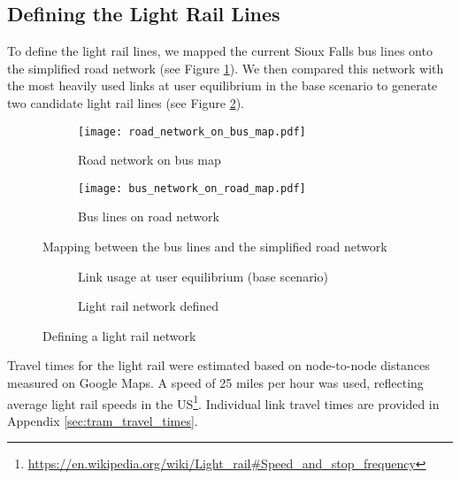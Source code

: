 \subsection{Defining the Light Rail Lines}

To define the light rail lines, we mapped the current Sioux Falls bus lines onto the simplified road network (see Figure \ref{fig:mapping_bus}). We then compared this network with the most heavily used links at user equilibrium in the base scenario to generate two candidate light rail lines (see Figure \ref{fig:light_rail_network}).

\begin{figure}
    \centering
    \begin{subfigure}{.45\textwidth}
        \centering
        \texttt{[image: road\_network\_on\_bus\_map.pdf]}
        \caption{Road network on bus map}
    \end{subfigure}%
    \begin{subfigure}{.45\textwidth}
        \centering
        \texttt{[image: bus\_network\_on\_road\_map.pdf]}
        \caption{Bus lines on road network}
    \end{subfigure}%
    \caption{Mapping between the bus lines and the simplified road network}
    \label{fig:mapping_bus}
\end{figure}

\begin{figure}
    \centering
    \begin{subfigure}{.45\textwidth}
        \centering
        \resizebox{.7\textwidth}{!}{}
        \caption{Link usage at user equilibrium (base scenario)}
    \end{subfigure}%
    \begin{subfigure}{.45\textwidth}
        \centering
        \resizebox{.7\textwidth}{!}{}
        \caption{Light rail network defined}
    \end{subfigure}%
    \caption{Defining a light rail network}
    \label{fig:light_rail_network}
\end{figure}

Travel times for the light rail were estimated based on node-to-node distances measured on Google Maps. A speed of 25 miles per hour was used, reflecting average light rail speeds in the US\footnote{\url{https://en.wikipedia.org/wiki/Light_rail\#Speed_and_stop_frequency}}. Individual link travel times are provided in Appendix \ref{sec:tram_travel_times}.

